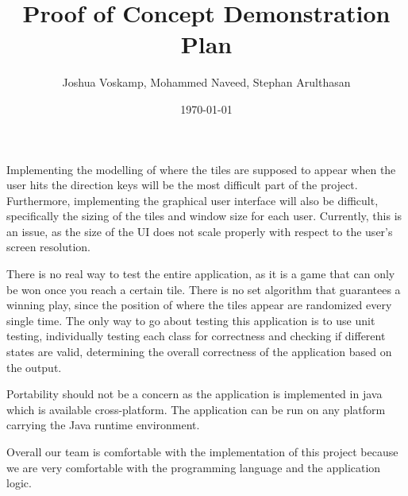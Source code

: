 \documentclass[12pt]{article}
\begin{document}
\title{\textbf{Proof of Concept Demonstration Plan}}
\author{Joshua Voskamp, Mohammed Naveed, Stephan Arulthasan}
\date{\today}
\maketitle


Implementing the modelling of where the tiles are supposed to appear when the user hits the direction keys will be the most difficult part of the project. Furthermore, implementing the graphical user interface will also be difficult, specifically the sizing of the tiles and window size for each user. Currently, this is an issue, as the size of the UI does not scale properly with respect to the user's screen resolution. 


There is no real way to test the entire application, as it is a game that can only be won once you reach a certain tile. There is no set algorithm that guarantees a winning play, since the position of where the tiles appear are randomized every single time. The only way to go about testing this application is to use unit testing, individually testing each class for correctness and checking if different states are valid, determining the overall correctness of the application based on the output.


Portability should not be a concern as the application is implemented in java which is available cross-platform. The application can be run on any platform carrying the Java runtime environment. 


Overall our team is comfortable with the implementation of this project because we are very comfortable with the programming language and the application logic. 
\end{document}
